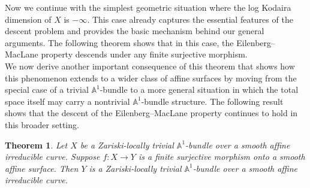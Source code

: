 \documentclass[12pt,reqno,twoside]{amsart}
\newtheorem{theorem}{Theorem}[section]
\theoremstyle{definition}
\numberwithin{equation}{section}
\newcommand{\A}{\mathbb{A}}
\begin{document}
\medskip

Now we continue with the simplest geometric situation where the log Kodaira dimension of $X$ is $-\infty$. This case already captures the essential features of the descent problem and provides the basic mechanism behind our general arguments. The following theorem shows that in this case, the Eilenberg--MacLane property descends under any finite surjective morphism.\\


We now derive another important consequence of this theorem that shows how this phenomenon extends to a wider class of affine surfaces by moving from the special case of a trivial $\A^1$-bundle to a more general situation in which the total space itself may carry a nontrivial $\A^1$-bundle structure. The following result shows that the descent of the Eilenberg--MacLane property continues to hold in this broader setting.



\begin{theorem}\label{Thm: Descent of A^1 bundle over affine curve}
Let $X$ be a Zariski-locally trivial $\A^1$-bundle over a smooth affine irreducible curve. Suppose $f \colon X \to Y$ is a finite surjective morphism onto a smooth affine surface. Then $Y$ is a Zariski-locally trivial $\A^1$-bundle over a smooth affine irreducible curve.
\end{theorem}
\end{document}
